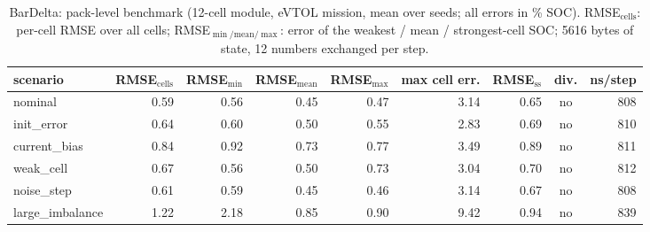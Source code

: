 \begin{table}[H]\centering\footnotesize\setlength{\tabcolsep}{4pt}\caption{BarDelta: pack-level benchmark (12-cell module, eVTOL mission, mean over seeds; all errors in \% SOC). RMSE$_\mathrm{cells}$: per-cell RMSE over all cells; RMSE$_{\min/\mathrm{mean}/\max}$: error of the weakest / mean / strongest-cell SOC; 5616 bytes of state, 12 numbers exchanged per step.}\label{tab:pack_BarDelta}
\begin{tabular}{lrrrrrrcr}\toprule scenario & RMSE$_\mathrm{cells}$ & RMSE$_{\min}$ & RMSE$_\mathrm{mean}$ & RMSE$_{\max}$ & max cell err. & RMSE$_\mathrm{ss}$ & div. & ns/step \\ \midrule
nominal & 0.59 & 0.56 & 0.45 & 0.47 & 3.14 & 0.65 & no & 808 \\
init\_error & 0.64 & 0.60 & 0.50 & 0.55 & 2.83 & 0.69 & no & 810 \\
current\_bias & 0.84 & 0.92 & 0.73 & 0.77 & 3.49 & 0.89 & no & 811 \\
weak\_cell & 0.67 & 0.56 & 0.50 & 0.73 & 3.04 & 0.70 & no & 812 \\
noise\_step & 0.61 & 0.59 & 0.45 & 0.46 & 3.14 & 0.67 & no & 808 \\
large\_imbalance & 1.22 & 2.18 & 0.85 & 0.90 & 9.42 & 0.94 & no & 839 \\
\bottomrule\end{tabular}\end{table}
